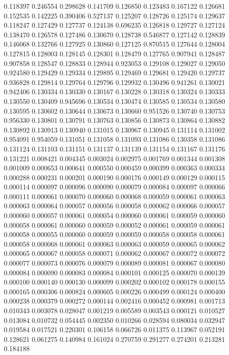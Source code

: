 0.118397
0.246554
0.298628
0.141709
0.126850
0.123483
0.167122
0.126681
0.152535
0.142225
0.390406
0.527137
0.125207
0.128726
0.125174
0.129637
0.118247
0.127429
0.127737
0.124138
0.696235
0.126818
0.129727
0.127124
0.138470
0.126578
0.127486
0.130670
0.128738
0.546877
0.127142
0.128839
0.146068
0.132766
0.127925
0.130860
0.127125
0.870515
0.127644
0.128004
0.127815
0.128003
0.128145
0.128301
0.128479
0.127765
0.907941
0.128487
0.907858
0.128547
0.128833
0.128944
0.923053
0.129108
0.129027
0.129050
0.924580
0.129429
0.129334
0.129895
0.129469
0.129681
0.129420
0.129737
0.936828
0.129814
0.129764
0.129796
0.129932
0.130496
0.941261
0.130021
0.942406
0.130334
0.130330
0.130167
0.130228
0.130318
0.130324
0.130333
0.130550
0.130409
0.945696
0.130534
0.130474
0.130585
0.130534
0.130580
0.130595
0.130602
0.130644
0.130673
0.130660
0.951526
0.130740
0.130753
0.956330
0.130801
0.130791
0.130763
0.130856
0.130873
0.130864
0.130882
0.130892
0.130913
0.130940
0.131015
0.130967
0.130945
0.131114
0.131002
0.954091
0.954059
0.131051
0.131058
0.131093
0.131086
0.130358
0.131086
0.131124
0.131103
0.131151
0.131137
0.131139
0.131154
0.131167
0.131176
0.131221
0.008421
0.004345
0.003024
0.002975
0.001769
0.001344
0.001308
0.001009
0.000653
0.000641
0.000550
0.000459
0.000399
0.000363
0.000334
0.000288
0.000231
0.000201
0.000190
0.000176
0.000149
0.000129
0.000115
0.000114
0.000097
0.000096
0.000090
0.000079
0.000084
0.000097
0.000066
0.000111
0.000061
0.000070
0.000060
0.000068
0.000059
0.000061
0.000063
0.000063
0.000064
0.000057
0.000056
0.000058
0.000062
0.000066
0.000057
0.000060
0.000057
0.000061
0.000054
0.000060
0.000061
0.000059
0.000060
0.000058
0.000061
0.000060
0.000059
0.000052
0.000061
0.000059
0.000061
0.000058
0.000055
0.000060
0.000059
0.000059
0.000058
0.000058
0.000061
0.000058
0.000068
0.000061
0.000063
0.000063
0.000059
0.000065
0.000062
0.000065
0.000067
0.000058
0.000071
0.000062
0.000067
0.000072
0.000072
0.000077
0.000073
0.000076
0.000079
0.000089
0.000081
0.000067
0.000080
0.000084
0.000090
0.000083
0.000084
0.000101
0.000125
0.000070
0.000139
0.000100
0.000140
0.000130
0.000099
0.000202
0.000102
0.000178
0.000155
0.000165
0.000306
0.000824
0.000605
0.000226
0.000499
0.000124
0.000400
0.000238
0.000379
0.000272
0.000144
0.002416
0.000452
0.000981
0.001713
0.010343
0.003078
0.028047
0.001219
0.005589
0.003543
0.000121
0.010527
0.013084
0.010732
0.054445
0.002350
0.010266
0.028594
0.080034
0.032947
0.019584
0.017521
0.220301
0.106158
0.066726
0.011375
0.113967
0.052191
0.128621
0.061275
0.140984
0.161024
0.270759
0.291277
0.274201
0.213281
0.184188
